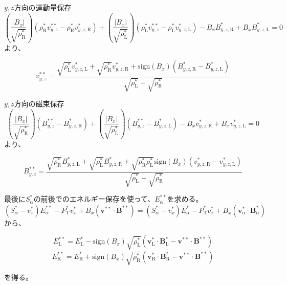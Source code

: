 $y,z$方向の運動量保存
\begin{equation}
\left(\frac{|B_x|}{\sqrt{\rho^*_\mathrm{R}}}\right)
\left( 
\rho^*_\mathrm{R} v^{**}_{y,z} -
 \rho^*_\mathrm{R} v^{*}_{y,z,\mathrm{R}} 
\right)
+ \left(\frac{|B_x|}{\sqrt{\rho^*_\mathrm{L}}}
\right)\left( 
\rho^*_\mathrm{L} v^{**}_{y,z} -
 \rho^*_\mathrm{L} v^{*}_{y,z,\mathrm{L}} 
\right)
 -B_x B^{*}_{y,z,\mathrm{R}}
 +B_x B^{*}_{y,z,\mathrm{L}}
=0
\label{hlld_riemanfan}
\end{equation}
より、
\begin{screen}
\begin{equation}
 v^{**}_{y,z} =
 \frac{
 \sqrt{\rho^*_\mathrm{L}} v^*_{y,z,\mathrm{L}}
 + \sqrt{\rho^*_\mathrm{R}} v^*_{y,z,\mathrm{R}}
 + \mathrm{sign}(B_x)( B^*_{y,z,\mathrm{R}}- B^*_{y,z,\mathrm{L}})
 }{
  \sqrt{\rho^*_\mathrm{L}} + \sqrt{\rho^*_\mathrm{R}} 
 }
\end{equation}
\end{screen}
$y,z$方向の磁束保存
\begin{equation}
\left(\frac{|B_x|}{\sqrt{\rho^*_\mathrm{R}}}\right)
\left( 
B^{**}_{y,z} -
 B^{*}_{y,z,\mathrm{R}} 
\right)
+ \left(\frac{|B_x|}{\sqrt{\rho^*_\mathrm{L}}}
\right)\left( 
B^{**}_{y,z} -
B^{*}_{y,z,\mathrm{L}} 
\right)
 -B_x v^{*}_{y,z,\mathrm{R}}
 +B_x v^{*}_{y,z,\mathrm{L}}
=0
\label{hlld_riemanfan}
\end{equation}
より、
\begin{screen}
\begin{equation}
 B^{**}_{y,z} =
 \frac{
 \sqrt{\rho^*_\mathrm{R}} B^*_{y,z,\mathrm{L}}
 + \sqrt{\rho^*_\mathrm{L}} B^*_{y,z,\mathrm{R}}
 + \sqrt{\rho^*_\mathrm{R}\rho^*_\mathrm{L}}
 \mathrm{sign}(B_x)( v^*_{y,z,\mathrm{R}}- v^*_{y,z,\mathrm{L}})
 }{
  \sqrt{\rho^*_\mathrm{L}} + \sqrt{\rho^*_\mathrm{R}} 
 }
\end{equation}
\end{screen}

最後に$S^*_\alpha$の前後でのエネルギー保存を使って、$E^{**}_\alpha$を求める。
\begin{equation}
    \left(S^*_\alpha - v^*_x\right)E^{**}_\alpha - 
    P^*_\mathrm{T} v^*_x + B_x (\bm{ v}^{**} \cdot \bm{ B}^{**})
    =  \left(S^*_\alpha - v^*_x\right)E^{*}_\alpha - 
    P^*_\mathrm{T} v^*_x + B_x (\bm{ v}^*_\alpha \cdot \bm{ B}^{*}_\alpha)
\end{equation}
から、
\begin{screen}
\begin{equation}
   E^{**}_\mathrm{L} = E^*_\mathrm{L} - \mathrm{sign}(B_x) 
   \sqrt{\rho^*_\mathrm{L}}
    (   
     \bm{ v}^*_\mathrm{L} \cdot \bm{ B}^{*}_\mathrm{L}
     - 
     \bm{ v}^{**} \cdot \bm{ B}^{**}
    )
\end{equation}
\begin{equation}
   E^{**}_\mathrm{R} = E^*_\mathrm{R} + \mathrm{sign}(B_x) 
   \sqrt{\rho^*_\mathrm{R}}
    (   
     \bm{ v}^*_\mathrm{R} \cdot \bm{ B}^{*}_\mathrm{R}
     - 
     \bm{ v}^{**} \cdot \bm{ B}^{**}
    )
\end{equation}
\end{screen}
を得る。


